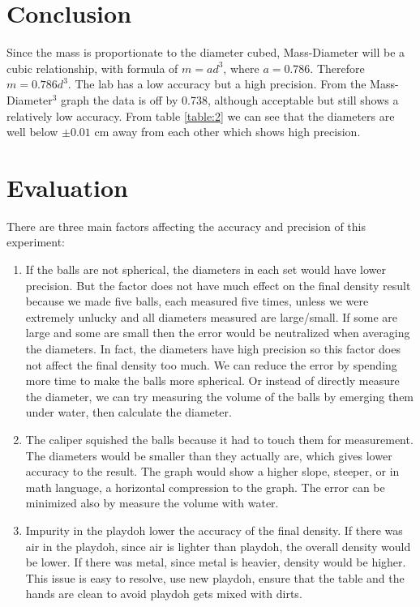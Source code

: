 \documentclass{article}
\begin{document}
\section{Conclusion}
Since the mass is proportionate to the diameter cubed, Mass-Diameter will be a cubic relationship, with formula of $m=ad^3$, where $a=0.786$. Therefore $\boxed{m=0.786d^3}$. The lab has a low accuracy but a high precision. From the Mass-Diameter$^3$ graph the data is off by 0.738, although acceptable but still shows a relatively low accuracy. From table \ref{table:2} we can see that the diameters are well below $\pm 0.01$ cm away from each other which shows high precision. 


\section{Evaluation}

There are three main factors affecting the accuracy and precision of this experiment: 
\begin{enumerate}
    \item If the balls are not spherical, the diameters in each set would have lower precision. But the factor does not have much effect on the final density result because we made five balls, each measured five times, unless we were extremely unlucky and all diameters measured are large/small. If some are large and some are small then the error would be neutralized when averaging the diameters. In fact, the diameters have high precision so this factor does not affect the final density too much. We can reduce the error by spending more time to make the balls more spherical. Or instead of directly measure the diameter, we can try measuring the volume of the balls by emerging them under water, then calculate the diameter. 
    \item The caliper squished the balls because it had to touch them for measurement. The diameters would be smaller than they actually are, which gives lower accuracy to the result. The graph would show a higher slope, steeper, or in math language, a horizontal compression to the graph. The error can be minimized also by measure the volume with water. \item Impurity in the playdoh lower the accuracy of the final density. If there was air in the playdoh, since air is lighter than playdoh, the overall density would be lower. If there was metal, since metal is heavier, density would be higher. This issue is easy to resolve, use new playdoh, ensure that the table and the hands are clean to avoid playdoh gets mixed with dirts. 
\end{enumerate}
\end{document}
